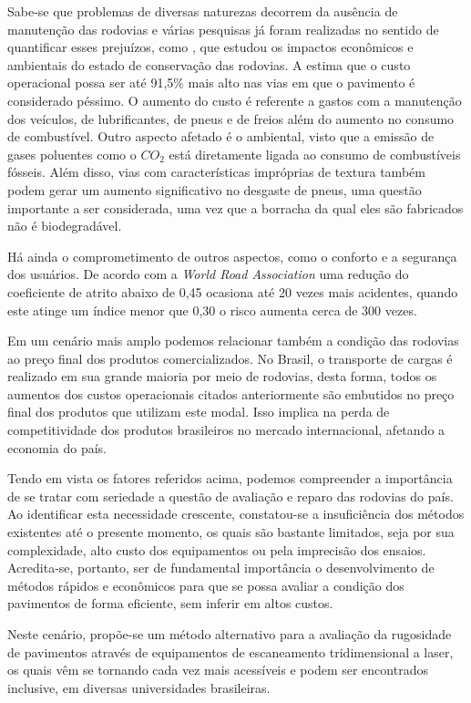 Sabe-se que problemas de diversas naturezas decorrem da ausência de manutenção das rodovias e várias pesquisas já foram realizadas no sentido de quantificar esses prejuízos, como , que estudou os impactos econômicos e ambientais do estado de conservação das rodovias. A  estima que o custo operacional possa ser até 91,5\% mais alto nas vias em que o pavimento é considerado péssimo. O aumento do custo é referente a gastos com a manutenção dos veículos, de lubrificantes, de pneus e de freios além do aumento no consumo de combustível. 
Outro aspecto afetado é o ambiental, visto que a emissão de gases poluentes como o $CO_2$ está diretamente ligada ao consumo de combustíveis fósseis. Além disso, vias com características impróprias de textura também podem gerar um aumento significativo no desgaste de pneus, uma questão importante a ser considerada, uma vez que a borracha da qual eles são fabricados não é biodegradável.

Há ainda o comprometimento de outros aspectos, como o conforto e a segurança dos usuários. De acordo com a \emph{World Road Association} \cite{celko} uma redução do coeficiente de atrito abaixo de 0,45 ocasiona até 20 vezes mais acidentes, quando este atinge um índice menor que 0,30 o risco aumenta cerca de 300 vezes.

Em um cenário mais amplo podemos relacionar também a condição das rodovias ao preço final dos produtos comercializados. No Brasil, o transporte de cargas é realizado em sua grande maioria por meio de rodovias, desta forma, todos os aumentos dos custos operacionais citados anteriormente são embutidos no preço final dos produtos que utilizam este modal. Isso implica na perda de competitividade dos produtos brasileiros no mercado internacional, afetando a economia do país. 

Tendo em vista os fatores referidos acima, podemos compreender a importância de se tratar com seriedade a questão de avaliação e reparo das rodovias do país. Ao identificar esta necessidade crescente, constatou-se a insuficiência dos métodos existentes até o presente momento, os quais são bastante limitados, seja por sua complexidade, alto custo dos equipamentos ou pela imprecisão dos ensaios. Acredita-se, portanto, ser de fundamental importância o desenvolvimento de métodos rápidos e econômicos para que se possa avaliar a condição dos pavimentos de forma eficiente, sem inferir em altos custos.

Neste cenário, propõe-se um método alternativo para a avaliação da rugosidade de pavimentos através de equipamentos de escaneamento tridimensional a laser, os quais vêm se tornando cada vez mais acessíveis e podem ser encontrados inclusive, em diversas universidades brasileiras.

